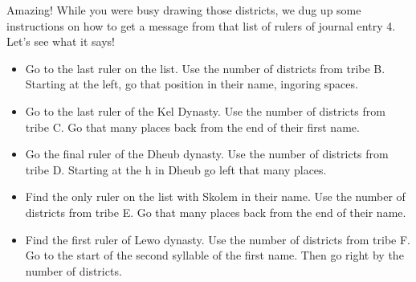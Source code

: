 Amazing!
While you were busy drawing those districts, we dug up some instructions on how to get a message from that list of rulers of journal entry 4.
Let's see what it says!

\begin{itemize}
        \item Go to the last ruler on the list. Use the number of districts from tribe B. Starting at the left, go that position in their name, ingoring spaces.
        \item Go to the last ruler of the Kel Dynasty. Use the number of districts from tribe C. Go that many places back from the end of their first name.
        \item Go the final ruler of the Dheub dynasty. Use the number of districts from tribe D. Starting at the h in Dheub go left that many places.
        \item Find the only ruler on the list with Skolem in their name. Use the number of districts from tribe E. Go that many places back from the end of their name.
        \item Find the first ruler of Lewo dynasty. Use the number of districts from tribe F. Go to the start of the second syllable of the first name. Then go right by the number of districts.
\end{itemize}